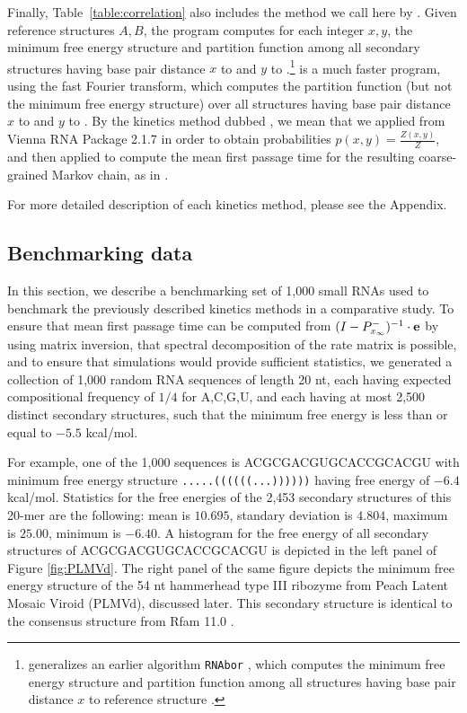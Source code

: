 Finally, Table~\ref{table:correlation}
also includes the method we call here by \rnatwofold.
Given reference structures $A,B$, the \rnatwofold  program
\citep{hofacker:RNAbor2D,Lorenz.amb11} computes for each integer
$x,y$, the minimum free energy structure and partition function
among all secondary structures having base pair distance $x$ to \strA
and $y$ to \strB.\footnote{\rnatwofold generalizes an earlier algorithm
{\tt RNAbor} \citep{Freyhult.b07,Freyhult.nar07}, which computes the
minimum free energy structure and partition function among all structures
having base pair distance $x$ to reference structure \strA.}
\ffttwo \citep{Senter.jmb14} is a much faster program, using the
fast Fourier transform, which
computes the partition function (but not the minimum free energy
structure) over all structures having base pair distance $x$ to \strA and
$y$ to \strB. By the kinetics method dubbed
\rnatwofold, we mean that we applied
\rnatwofold from Vienna RNA Package 2.1.7
\citep{hofacker:RNAbor2D,Lorenz.amb11} in order
to obtain probabilities $p(x,y) = \frac{Z(x,y)}{Z}$,
and then applied \hermes to compute the mean first passage time for
the resulting coarse-grained Markov chain, as in \fftmfpt.

For more detailed description of each kinetics method, please see
the Appendix.

\subsection{Benchmarking data}

In this section, we describe a
benchmarking set of 1,000 small RNAs used to benchmark the previously
described kinetics methods in a comparative study. To ensure that mean
first passage time can be computed from
$(I - P^{-}_{x_{\infty}})^{-1} \cdot {\bf e}$ by using matrix
inversion, that spectral decomposition of the rate matrix is possible,
and to ensure that \kinfold simulations would provide sufficient
statistics, we generated a collection of 1,000 random RNA sequences of
length 20 nt, each having expected compositional frequency of $1/4$
for A,C,G,U, and each having at most 2,500 distinct secondary
structures, such that the minimum free energy is less than or equal to
$-5.5$ kcal/mol.

For example, one of the 1,000 sequences is ACGCGACGUGCACCGCACGU with
minimum free energy structure {\tt .....((((((...))))))} having free
energy of $-6.4$ kcal/mol. Statistics for the free energies of the
2,453 secondary structures of this 20-mer are the following: mean is
$10.695$, standary deviation is $4.804$, maximum is $25.00$, minimum
is $-6.40$. A histogram for the free energy of all secondary
structures of ACGCGACGUGCACCGCACGU is depicted in
the left panel of Figure \ref{fig:PLMVd}. The right panel of the
same figure depicts the minimum free energy structure of the
54 nt hammerhead type III ribozyme from Peach Latent Mosaic Viroid
(PLMVd), discussed later. This secondary structure is identical
to the consensus structure from Rfam 11.0 \citep{Gardner.nar11}.


